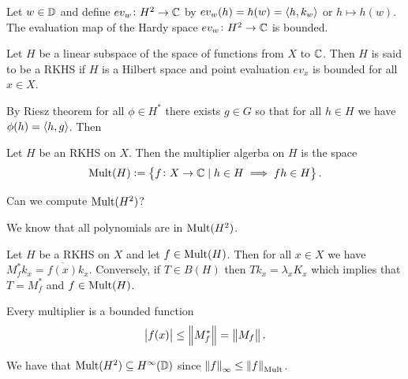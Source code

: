 \documentclass[11pt,a4paper]{article}
\begin{document}
\begin{remark}
  Let $w \in \mathbb{D}$ and define
  $ev_w \colon H^2 \to \mathbb{C}$ by
  $ev_w(h) = h(w) = \left\langle h, k_w \right\rangle$ or $h \mapsto h(w)$.
  The evaluation map of the Hardy space $ev_w \colon H^2 \to \mathbb{C}$ is bounded.
\end{remark}

\begin{definition}
  Let $H$ be a linear subspace of the space of functions from $X$ to $\mathbb{C}$.
  Then $H$ is said to be a RKHS if $H$ is a Hilbert space and
  point evaluation $ev_x$ is bounded for all $x \in X$.
\end{definition}

By Riesz theorem for all $\phi \in H^*$ there exists $g \in G$
so that for all $h \in H$ we have $\phi(h) = \left\langle h, g \right\rangle$.
Then %

\begin{definition}
  
\end{definition}


\begin{definition}
  Let $H$ be an RKHS on $X$.
  Then the multiplier algerba on $H$ is the space
  \[
    \operatorname{Mult}(H) :=
    \left\{f \colon X \to \mathbb{C} \mid h \in H \implies f h \in H\right\}.
  \]
\end{definition}


\begin{question}
  Can we compute $\operatorname{Mult}(H^2)$?
\end{question}
\begin{answer}
  We know that all polynomials are in $\operatorname{Mult}(H^2)$.
\end{answer}

\begin{proposition}
  \label{prop:temp}
  Let $H$ be a RKHS on $X$ and let $f \in \operatorname{Mult}(H)$.
  Then for all $x \in X$ we have $M_f^* k_x = \overline{f(x)} k_x$.
  Conversely, if $T \in B(H)$ then
  $T k_x = \lambda_x K_x$ which implies that $T = M_f^*$
  and $f \in \operatorname{Mult}(H)$.
\end{proposition}

\begin{corollary}
  Every multiplier is a bounded function
  \[
    \left\lvert f(x)\right\rvert \le \left\lVert M_f^*\right\rVert = \left\lVert M_f\right\rVert.
  \]
\end{corollary}
\begin{corollary}
  We have that $\operatorname{Mult}(H^2) \subseteq H^{\infty}(\mathbb{D})$
  since $\left\lVert f\right\rVert_{\infty} \le \left\lVert f\right\rVert_{\operatorname{Mult}}$.
\end{corollary}
\end{document}
